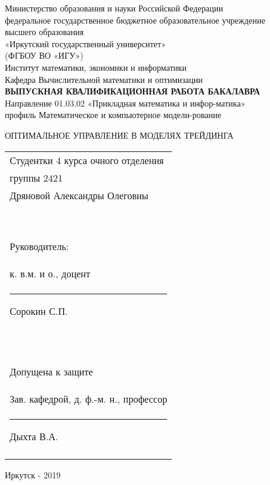 \begin{titlepage}
\begin{center}
\hfill \break
\normalsize{Министерство образования и науки Российской Федерации \\ федеральное государственное бюджетное образовательное учреждение}\\
 
\normalsize{высшего образования}\\
\normalsize{«Иркутский государственный университет» }\\
\normalsize{(ФГБОУ ВО «ИГУ»)}\\
\hfill \break
\normalsize{Институт математики, экономики и информатики}\\
\normalsize{Кафедра Вычислительной математики и оптимизации}\\
\hfill \break
\hfill \break
\hfill \break
\hfill \break
\hfill \break
\hfill \break
\large{\textbf{ВЫПУСКНАЯ КВАЛИФИКАЦИОННАЯ РАБОТА
БАКАЛАВРА}}\\
\hfill \break
\normalsize{
Направление  01.03.02 «Прикладная математика и инфор-матика»\\
профиль Математическое и компьютерное модели-рование }\\
\hfill \break
 
\normalsize{ОПТИМАЛЬНОЕ УПРАВЛЕНИЕ В МОДЕЛЯХ ТРЕЙДИНГА} 
\end{center}
\hfill \break
\hfill \break
\begin{flushright} %
\begin{tabular}{p{}} %


Студентки 4 курса очного отделения\\
группы 2421\\
Дряновой Александры Олеговны\\\

Руководитель:\\
к. в.м. и о., доцент\\
\rule{3cm}{0.25pt}  Сорокин С.П.\\\

Допущена к защите\\
Зав. кафедрой, д. ф.-м. н., профессор\\
 \rule{3cm}{0.25pt}  Дыхта В.А.\\\\

\end{tabular}
\end{flushright}
\hfill \break
\begin{center} Иркутск - 2019 \end{center}
\pagestyle{empty} %
\end{titlepage}
